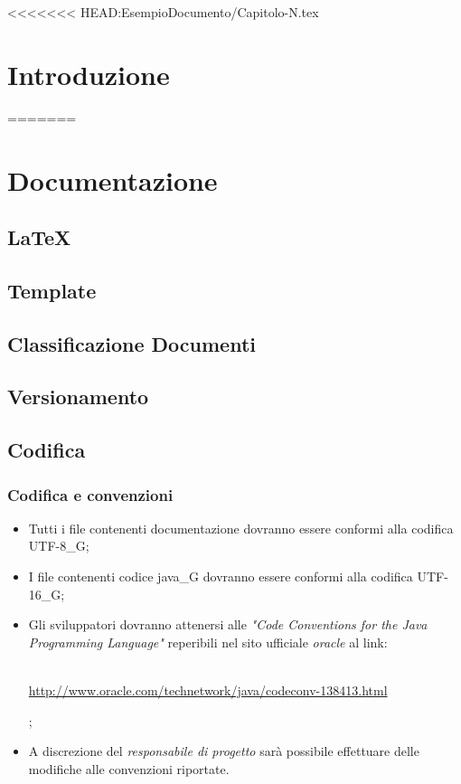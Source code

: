 <<<<<<< HEAD:EsempioDocumento/Capitolo-N.tex
\section{Introduzione}
=======
\section{Documentazione}
\subsection{LaTeX}
\subsection{Template}
\subsection{Classificazione Documenti}
\subsection{Versionamento}
\subsection{Codifica}
\subsubsection{Codifica e convenzioni}
\begin{itemize}
>>>>>>> seresin:NormeDiProgetto/Capitolo-1.tex

\item Tutti i file contenenti documentazione dovranno essere conformi alla codifica UTF-8_G;

\item I file contenenti codice java_G  dovranno essere conformi alla codifica UTF-16_G;

\item Gli sviluppatori dovranno attenersi alle \textit{"Code Conventions for the Java Programming Language"} reperibili nel sito ufficiale \textit{oracle} al link:\\ \\
\centerline{ \url{http://www.oracle.com/technetwork/java/codeconv-138413.html}};

\item A discrezione del \textit{responsabile di progetto} sarà possibile effettuare delle modifiche alle convenzioni riportate.
\end{itemize}

